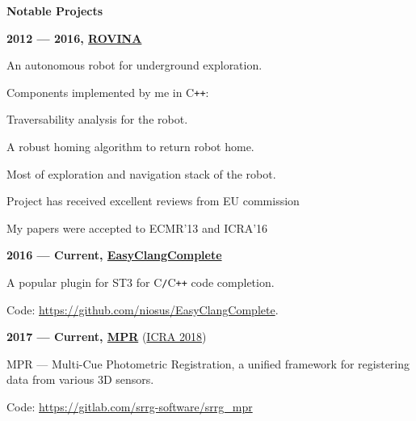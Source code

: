 \documentclass[a4paper,12pt,final]{memoir}
\newcommand{\SmallSep}{\vspace{0.5em}}
\newcommand{\CVSection}[1]
	{\Large\textbf{#1}\par
	\SmallSep\normalsize\normalfont}
\newcommand{\CVItem}[1]
	{\textbf{\color{MidnightBlue} #1}}
\begin{document}
\CVSection{Notable Projects}
\CVItem{2012 --- 2016, \href{http://www.rovina-project.eu/}{ROVINA}}
\begin{compactitem}[\color{MidnightBlue}$\circ$]
	\item An autonomous robot for underground exploration.
	\item Components implemented by me in C\texttt{++}:
	\begin{compactitem}[\color{MidnightBlue}$-$]
	 	\item Traversability analysis for the robot.
	 	\item A robust homing algorithm to return robot home.
		\item Most of exploration and navigation stack of the robot.
	 \end{compactitem}
	\item Project has received excellent reviews from EU commission
	\item My papers were accepted to ECMR'13 and ICRA'16
\end{compactitem}
\CVItem{2016 --- Current, \href{https://niosus.github.io/EasyClangComplete/}{EasyClangComplete}}
\begin{compactitem}[\color{MidnightBlue}$\circ$]
	\item A popular plugin for ST3 for C\texttt{/}C\texttt{++} code completion.
	\item Code: \url{https://github.com/niosus/EasyClangComplete}.
\end{compactitem}
\CVItem{2017 --- Current, \href{https://gitlab.com/srrg-software/srrg_mpr}{MPR}} (\href{http://icra2018.org/}{ICRA 2018})
\begin{compactitem}[\color{MidnightBlue}$\circ$]
	\item MPR --- Multi-Cue Photometric Registration, a unified framework for
	registering data from various 3D sensors.
	\item Code: \url{https://gitlab.com/srrg-software/srrg_mpr}
\end{compactitem}
\SmallSep
\end{document}
